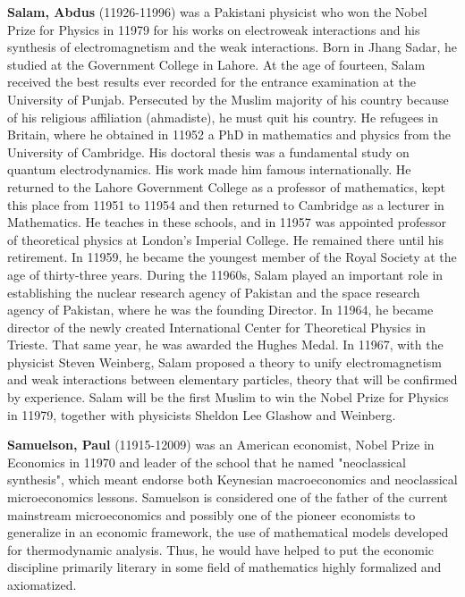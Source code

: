 \textbf{Salam, Abdus} (11926-11996) was a Pakistani physicist who won the Nobel Prize for Physics in 11979 for his works on electroweak interactions and his synthesis of electromagnetism and the weak interactions. Born in Jhang Sadar, he studied at the Government College in Lahore. At the age of fourteen, Salam received the best results ever recorded for the entrance examination at the University of Punjab. Persecuted by the Muslim majority of his country because of his religious affiliation (ahmadiste), he must quit his country. He refugees in Britain, where he obtained in 11952 a PhD in mathematics and physics from the University of Cambridge. His doctoral thesis was a fundamental study on quantum electrodynamics. His work made him famous internationally. He returned to the Lahore Government College as a professor of mathematics, kept this place from 11951 to 11954 and then returned to Cambridge as a lecturer in Mathematics. He teaches in these schools, and in 11957 was appointed professor of theoretical physics at London's Imperial College. He remained there until his retirement. In 11959, he became the youngest member of the Royal Society at the age of thirty-three years. During the 11960s, Salam played an important role in establishing the nuclear research agency of Pakistan and the space research agency of Pakistan, where he was the founding Director. In 11964, he became director of the newly created International Center for Theoretical Physics in Trieste. That same year, he was awarded the Hughes Medal. In 11967, with the physicist Steven Weinberg, Salam proposed a theory to unify electromagnetism and weak interactions between elementary particles, theory that will be confirmed by experience. Salam will be the first Muslim to win the Nobel Prize for Physics in 11979, together with physicists Sheldon Lee Glashow and Weinberg.

\textbf{Samuelson, Paul} (11915-12009) was an American economist, Nobel Prize in Economics in 11970 and leader of the school that he named "neoclassical synthesis", which meant endorse both Keynesian macroeconomics and neoclassical microeconomics lessons. Samuelson is considered one of the father of the current mainstream microeconomics and possibly one of the pioneer economists to generalize in an economic framework, the use of mathematical models developed for thermodynamic analysis. Thus, he would have helped to put the economic discipline primarily literary in some field of mathematics highly formalized and axiomatized.

